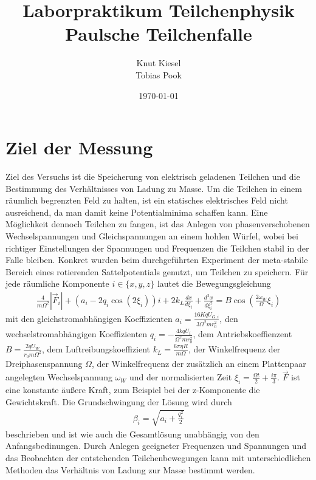 \documentclass[a4paper,12pt]{article}
\title{Laborpraktikum Teilchenphysik\\ Paulsche Teilchenfalle}
\author{Knut Kiesel\\Tobias Pook}
\date{\today}
\begin{document}
\maketitle
\vspace{5cm}
\tableofcontents
\thispagestyle{empty}
\newpage
\setcounter{page}{1}

\section{Ziel der Messung}
Ziel des Versuchs ist die Speicherung von elektrisch geladenen Teilchen und die Bestimmung des Verhältnisses von Ladung zu Masse.
Um die Teilchen in einem räumlich begrenzten Feld zu halten, ist ein statisches elektrisches Feld nicht ausreichend, da man damit keine Potentialminima schaffen kann.
Eine Möglichkeit dennoch Teilchen zu fangen, ist das Anlegen von phasenverschobenen Wechselspannungen und Gleichspannungen an einem hohlen Würfel, wobei bei richtiger 
Einstellungen der Spannungen und Frequenzen die Teilchen stabil in der Falle bleiben.
Konkret wurden beim durchgeführten Experiment der meta-stabile Bereich eines rotierenden Sattelpotentials genutzt, um Teilchen zu speichern.
Für jede räumliche Komponente $i\in\{x,y,z\}$ lautet die Bewegungsgleichung
\begin{align}\label{mastergleichung}
	\frac{4}{mΩ^2} |\vec{F}_i| + \left( a_i -2q_i \cos\left( 2\xi_i \right) \right) i  + 2k_L \frac{dx}{d\xi_i} + \frac{d^2x}{d\xi_i^2} = B\cos\left( \frac{2ω_W}{Ω}ξ_i \right)
\end{align}
mit den gleichstromabhängigen Koeffizienten $a_i = \frac{16KqU_{G,i}}{3Ω^2mr_0^2}$,
den wechselstromabhängigen Koeffizienten  $q_i = -\frac{4kqU_i}{Ω^2mr_0^2}$,
dem Antriebskoeffienzent $B = \frac{2qU_W}{r_0mΩ^2}$,
dem Luftreibungskoeffizient $k_L = \frac{6πηR}{mΩ}$, der Winkelfrequenz der Dreiphasenspannung $Ω$,
der Winkelfrequenz der zusätzlich an einem Plattenpaar angelegten Wechselspannung $ω_W$
und der normalisierten Zeit $ξ_i = \frac{Ωt}{2} + \frac{iπ}{3}$.
$\vec{F}$ ist eine konstante äußere Kraft, zum Beispiel bei der z-Komponente die Gewichtskraft.
Die Grundschwingung der Lösung wird durch
\begin{align}\label{eq:beta}
β_i = \sqrt{a_i + \frac{q_i^2}{2}}
\end{align}
beschrieben und ist wie auch die Gesamtlösung unabhängig von den Anfangsbedinungen.
Durch Anlegen geeigneter Frequenzen und Spannungen und das Beobachten der entstehenden Teilchenbewegungen kann mit unterschiedlichen Methoden das Verhältnis von Ladung zur Masse bestimmt werden.
\end{document}
